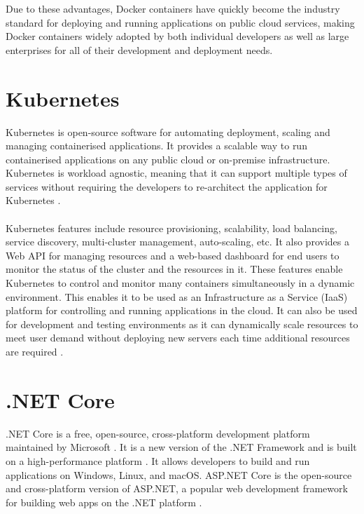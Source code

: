 \documentclass[BIF,Bachelor,nenglish]{twbook}%
\begin{document}
\noindent
Due to these advantages, Docker containers have quickly become the industry standard for deploying and running applications on public cloud services, making Docker containers widely adopted by both individual developers as well as large enterprises for all of their development and deployment needs.

\section{Kubernetes}
Kubernetes is open-source software for automating deployment, scaling and managing containerised applications. It provides a scalable way to run containerised applications on any public cloud or on-premise infrastructure. Kubernetes is workload agnostic, meaning that it can support multiple types of services without requiring the developers to re-architect the application for Kubernetes \cite{luk2018}.
\\
\\
Kubernetes features include resource provisioning, scalability, load balancing, service discovery, multi-cluster management, auto-scaling, etc. It also provides a Web API for managing resources and a web-based dashboard for end users to monitor the status of the cluster and the resources in it. These features enable Kubernetes to control and monitor many containers simultaneously in a dynamic environment. This enables it to be used as an Infrastructure as a Service (IaaS) platform for controlling and running applications in the cloud. It can also be used for development and testing environments as it can dynamically scale resources to meet user demand without deploying new servers each time additional resources are required \cite{kubernetes}.

\section{.NET Core}
.NET Core is a free, open-source, cross-platform development platform maintained by Microsoft \cite{dotnetintro}. It is a new version of the .NET Framework and is built on a high-performance platform \cite{dotnetintro}. It allows developers to build and run applications on Windows, Linux, and macOS. ASP.NET Core is the open-source and cross-platform version of ASP.NET, a popular web development framework for building web apps on the .NET platform \cite{dotnetaspcore}.
\end{document}
